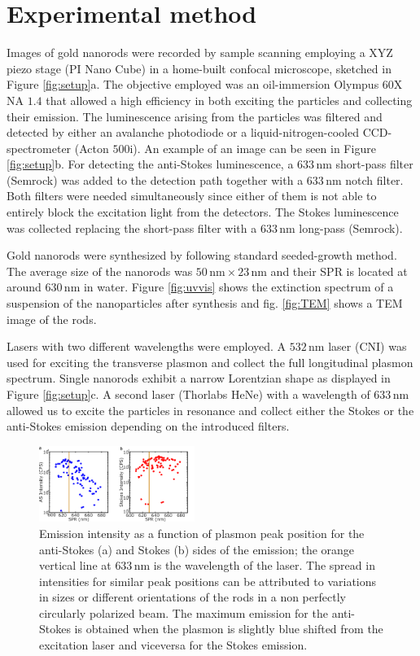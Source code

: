 \documentclass[journal=nalefd,manuscript=letter]{achemso}
\newcommand{\nm}{\ensuremath{\,\textrm{nm}}}
\begin{document}
\section{Experimental method}
Images of gold nanorods were recorded by sample scanning employing a XYZ piezo
stage (PI Nano Cube) in a  home-built confocal microscope, sketched in Figure
\ref{fig:setup}a. The objective employed was an oil-immersion Olympus 60X NA
$1.4$ that allowed a high efficiency in both exciting the particles and
collecting their emission. The luminescence arising from the particles was
filtered and detected by either an avalanche photodiode or a
liquid-nitrogen-cooled CCD-spectrometer (Acton $500\textrm{i}$). An example of
an image can be seen in Figure \ref{fig:setup}b. For detecting the anti-Stokes
luminescence, a $633\nm$ short-pass filter (Semrock) was added to the detection
path together with a $633\nm$ notch filter. Both filters were needed
simultaneously since either of them is not able to entirely block the excitation
light from the detectors. The Stokes luminescence was collected replacing the
short-pass filter with a $633\nm$ long-pass (Semrock).

Gold nanorods were synthesized by following standard seeded-growth
method\cite{Nikoobakht2003}. The average size of the nanorods was $50\nm\times
23\nm$ and their SPR is located at around $630\nm$ in water. Figure
\ref{fig:uvvis} shows the extinction spectrum of a suspension of the
nanoparticles after synthesis and fig. \ref{fig:TEM} shows a TEM image of the
rods.

Lasers with two different wavelengths were employed. A $532\nm$ laser (CNI) was
used for exciting the transverse plasmon and collect the full longitudinal
plasmon spectrum. Single nanorods exhibit a narrow Lorentzian shape as displayed
in Figure \ref{fig:setup}c. A second laser (Thorlabs HeNe) with a wavelength of
$633\nm$ allowed us to excite the particles in resonance and collect either the
Stokes or the anti-Stokes emission depending on the introduced filters.

\begin{figure}[htp] \centering
\includegraphics[width=0.45\textwidth]{Figures/02_Intensity_SPR/Intensity_SPR.png}
\caption{Emission intensity as a function of plasmon peak position for the
anti-Stokes (a) and Stokes (b) sides of the emission; the orange vertical line
at $633\nm$ is the wavelength of the laser. The spread in intensities for
similar peak positions can be attributed to variations in sizes or different
orientations of the rods in a non perfectly circularly polarized beam. The
maximum emission for the anti-Stokes is obtained when the plasmon is slightly
blue shifted from the excitation laser and viceversa for the Stokes emission.}
	\label{fig:emission_peak_position}
\end{figure} 
\end{document}
